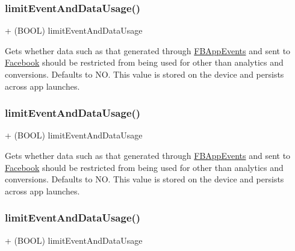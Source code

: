 \subsubsection{\texorpdfstring{limit\+Event\+And\+Data\+Usage()}{limitEventAndDataUsage()}\hspace{0.1cm}{\footnotesize\ttfamily [3/5]}}
{\footnotesize\ttfamily + (B\+O\+OL) limit\+Event\+And\+Data\+Usage \begin{DoxyParamCaption}{ }\end{DoxyParamCaption}}

Gets whether data such as that generated through \hyperlink{interfaceFBAppEvents}{F\+B\+App\+Events} and sent to \hyperlink{interfaceFacebook}{Facebook} should be restricted from being used for other than analytics and conversions. Defaults to NO. This value is stored on the device and persists across app launches. \mbox{\label{interfaceFBSettings_a3a939ba08bcff55d53c8e42f9a9e0234}} 
\subsubsection{\texorpdfstring{limit\+Event\+And\+Data\+Usage()}{limitEventAndDataUsage()}\hspace{0.1cm}{\footnotesize\ttfamily [4/5]}}
{\footnotesize\ttfamily + (B\+O\+OL) limit\+Event\+And\+Data\+Usage \begin{DoxyParamCaption}{ }\end{DoxyParamCaption}}

Gets whether data such as that generated through \hyperlink{interfaceFBAppEvents}{F\+B\+App\+Events} and sent to \hyperlink{interfaceFacebook}{Facebook} should be restricted from being used for other than analytics and conversions. Defaults to NO. This value is stored on the device and persists across app launches. \mbox{\label{interfaceFBSettings_a3a939ba08bcff55d53c8e42f9a9e0234}} 
\subsubsection{\texorpdfstring{limit\+Event\+And\+Data\+Usage()}{limitEventAndDataUsage()}\hspace{0.1cm}{\footnotesize\ttfamily [5/5]}}
{\footnotesize\ttfamily + (B\+O\+OL) limit\+Event\+And\+Data\+Usage \begin{DoxyParamCaption}{ }\end{DoxyParamCaption}}

